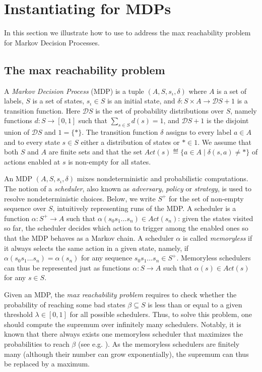 \section{Instantiating {\ADPDR} for MDPs}\label{sec:pdr:MDP}
In this section we illustrate how to use {\ADPDR} to address the max reachability problem \cite{BK08} for Markov Decision Processes.

\subsection{The max reachability problem}
A \emph{Markov Decision Process} (MDP) is a tuple  $(A, S, s_\iota, \delta)$ where $A$ is a set of labels, $S$ is a set of states, $s_\iota \in S$ is an initial state, and $\delta \colon S\times A  \to \mathcal{D}S + 1$ is a transition function.
Here $\mathcal{D}S$ is the set of probability distributions over $S$, namely functions $d\colon S\to [0, 1]$ such that $\sum_{s\in S} d(s)=1$, and $\mathcal{D}S + 1$ is the disjoint union of $\mathcal{D}S$ and $1=\{*\}$. The transition function $\delta$ assigns to every label $a\in A$ and to every state $s\in S$ either a distribution of states or $* \in 1$. We assume that both $S$ and $A$ are finite sets and that the set $\mathit{Act}(s) \eqdef \{ a\in A \mid \delta(s,a)\neq *\}$ of actions enabled at $s$ is non-empty for all states.

An MDP $(A, S, s_\iota, \delta)$ mixes nondeterministic and probabilistic computations. The notion of a \emph{scheduler}, also known as \emph{adversary}, \emph{policy} or \emph{strategy}, is used to resolve nondeterministic choices.
Below, we write $S^+$ for the set of non-empty sequence over $S$, intuitively representing runs of the MDP.
A scheduler is a function $\alpha \colon S^+ \to A$ such that $\alpha(s_0 s_1\dots s_n)\in \mathit{Act}(s_n)$: given the states visited so far, the scheduler decides which action to trigger among the enabled ones so that the MDP behaves as a Markov chain. A scheduler $\alpha$ is called \emph{memoryless} if it always selects the same action in a given state, namely, if $\alpha(s_0 s_1\dots s_n)=\alpha(s_n)$ for any sequence $s_0 s_1\dots s_n\in S^+$. Memoryless schedulers can thus be represented just as functions $\alpha \colon S \to A$ such that $\alpha(s)\in \mathit{Act}(s)$ for any $s\in S$.

Given an MDP, the \emph{max reachability problem} requires to check whether the probability of reaching some bad states $\beta \subseteq S$ is less than or equal to a given threshold $\lambda \in [0, 1]$ for all possible schedulers.
Thus, to solve this problem, one should compute the supremum over infinitely many schedulers. Notably, it is known that there always exists one memoryless scheduler that maximizes the probabilities to reach $\beta$  (see e.g. \cite{BK08}). As the memoryless schedulers are finitely many (although their number can grow exponentially), the supremum can thus be replaced by a maximum.

